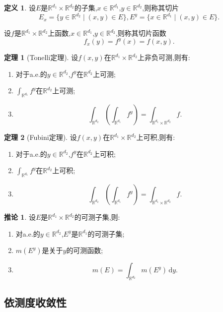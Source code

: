 \documentclass{ctexart}
\theoremstyle{definition}
\newtheorem{definition}{定义}
\newtheorem{theorem}{定理}
\newtheorem{corollary}{推论}
\theoremstyle{remark}
\begin{document}
	\begin{definition}
		设$E$是$\mathbb{R}^{d_1}\times\mathbb{R}^{d_2}$的子集,$x\in\mathbb{R}^{d_1}$,$y\in\mathbb{R}^{d_2}$,则称其切片
		$$E_x=\{y\in\mathbb{R}^{d_2}\mid(x,y)\in E\},
		E^y=\{x\in\mathbb{R}^{d_1}\mid(x,y)\in E\}.$$
		
		设$f$是$\mathbb{R}^{d_1}\times\mathbb{R}^{d_2}$上函数,$x\in\mathbb{R}^{d_1}$,$y\in\mathbb{R}^{d_2}$,则称其切片函数
		$$f_x(y)=f^y(x)=f(x,y).$$
	\end{definition}
	\begin{theorem}[Tonelli定理]
		设$f(x,y)$在$\mathbb{R}^{d_1}\times\mathbb{R}^{d_2}$上非负可测,则有:
		\begin{enumerate}
			\item 对于a.e.的$y\in\mathbb{R}^{d_2}$,$f^y$在$\mathbb{R}^{d_2}$上可测;
			\item $\int_{\mathbb{R}^{d_1}}{f^y}$在$\mathbb{R}^{d_2}$上可测;
			\item $$\int_{\mathbb{R}^{d_2}}{\left(\int_{\mathbb{R}^{d_1}}{f^y}\right)}=\int_{\mathbb{R}^{d_1}\times\mathbb{R}^{d_2}}{f}.$$
		\end{enumerate}
	\end{theorem}
	\begin{theorem}[Fubini定理]
		设$f(x,y)$在$\mathbb{R}^{d_1}\times\mathbb{R}^{d_2}$上可积,则有:
		\begin{enumerate}
			\item 对于a.e.的$y\in\mathbb{R}^{d_2}$,$f^y$在$\mathbb{R}^{d_2}$上可积;
			\item $\int_{\mathbb{R}^{d_1}}{f^y}$在$\mathbb{R}^{d_2}$上可积;
			\item $$\int_{\mathbb{R}^{d_2}}{\left(\int_{\mathbb{R}^{d_1}}{f^y}\right)}=\int_{\mathbb{R}^{d_1}\times\mathbb{R}^{d_2}}{f}.$$
		\end{enumerate}
	\end{theorem}
	\begin{corollary}
		设$E$是$\mathbb{R}^{d_1}\times\mathbb{R}^{d_2}$的可测子集,则:
		\begin{enumerate}
			\item 对a.e.的$y\in\mathbb{R}^{d_2}$,$E^y$是$\mathbb{R}^{d_1}$的可测子集;
			\item $m(E^y)$是关于$y$的可测函数;
			\item $$m(E)=\int_{\mathbb{R}^{d_2}}{m(E^y)\,\mathrm{d}y}.$$
		\end{enumerate}
	\end{corollary}
	
	\subsection{依测度收敛性}
	
\end{document}
